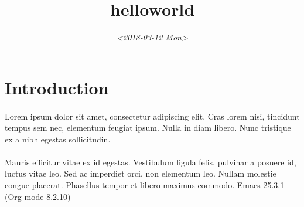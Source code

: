 \documentclass[11pt]{article}
\date{\textit{<2018-03-12 Mon>}}
\title{helloworld}
\begin{document}
\maketitle
\tableofcontents


\section{Introduction}
\label{sec:orga3c33ed}

\paragraph{}
Lorem ipsum dolor sit amet, consectetur adipiscing elit. Cras lorem
nisi, tincidunt tempus sem nec, elementum feugiat ipsum. Nulla in
diam libero. Nunc tristique ex a nibh egestas sollicitudin.

\paragraph{}
Mauris efficitur vitae ex id egestas. Vestibulum ligula felis,
pulvinar a posuere id, luctus vitae leo. Sed ac imperdiet orci, non
elementum leo. Nullam molestie congue placerat. Phasellus tempor et
libero maximus commodo.
Emacs 25.3.1 (Org mode 8.2.10)
\end{document}
